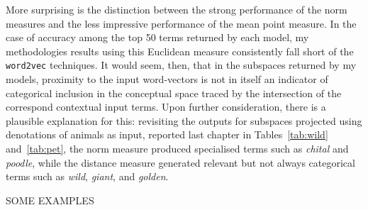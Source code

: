 More surprising is the distinction between the strong performance of the norm measures and the less impressive performance of the mean point measure.  In the case of accuracy among the top 50 terms returned by each model, my methodologies results using this Euclidean measure consistently fall short of the \texttt{word2vec} techniques.  It would seem, then, that in the subspaces returned by my models, proximity to the input word-vectors is not in itself an indicator of categorical inclusion in the conceptual space traced by the intersection of the correspond contextual input terms.  Upon further consideration, there is a plausible explanation for this: revisiting the outputs for subspaces projected using denotations of animals as input, reported last chapter in Tables~\ref{tab:wild} and~\ref{tab:pet}, the norm measure produced specialised terms such as \emph{chital} and \emph{poodle}, while the distance measure generated relevant but not always categorical terms such as \emph{wild}, \emph{giant}, and \emph{golden}.

SOME EXAMPLES

